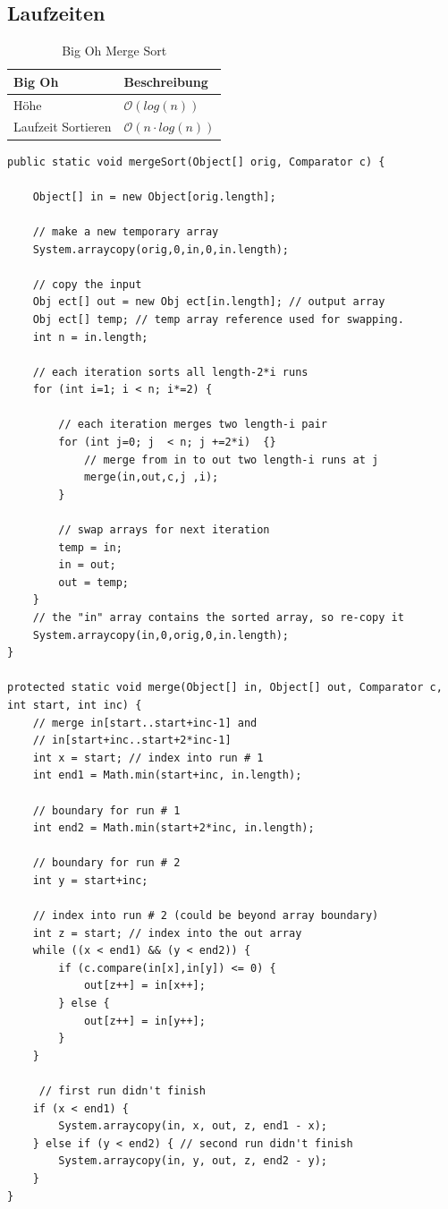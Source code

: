 \subsection{Laufzeiten}
\begin{table}[h]
	\centering
	\begin{tabu} to \linewidth {l l}
		\toprule
		Big Oh & Beschreibung \\
		\midrule
		Höhe & $\mathcal{O}(log (n))$ \\
		Laufzeit Sortieren & $\mathcal{O}(n \cdot log(n))$ \\
		\bottomrule
	\end{tabu}
	\caption{Big Oh Merge Sort}
\end{table}

\clearpage

\begin{lstlisting}[caption=Nicht Rekursiver Merge Sort]
public static void mergeSort(Object[] orig, Comparator c) {

	Object[] in = new Object[orig.length];

	// make a new temporary array
	System.arraycopy(orig,0,in,0,in.length);

	// copy the input
	Obj ect[] out = new Obj ect[in.length]; // output array
	Obj ect[] temp; // temp array reference used for swapping.
	int n = in.length;

	// each iteration sorts all length-2*i runs
	for (int i=1; i < n; i*=2) {

		// each iteration merges two length-i pair
		for (int j=0; j  < n; j +=2*i)  {}
			// merge from in to out two length-i runs at j
			merge(in,out,c,j ,i);
		}

		// swap arrays for next iteration
		temp = in;
		in = out;
		out = temp;
	}
	// the "in" array contains the sorted array, so re-copy it
	System.arraycopy(in,0,orig,0,in.length);
}

protected static void merge(Object[] in, Object[] out, Comparator c, int start, int inc) {
	// merge in[start..start+inc-1] and
	// in[start+inc..start+2*inc-1]
	int x = start; // index into run # 1
	int end1 = Math.min(start+inc, in.length);

	// boundary for run # 1
	int end2 = Math.min(start+2*inc, in.length);

	// boundary for run # 2
	int y = start+inc;

	// index into run # 2 (could be beyond array boundary)
	int z = start; // index into the out array
	while ((x < end1) && (y < end2)) {
		if (c.compare(in[x],in[y]) <= 0) {
			out[z++] = in[x++];
		} else {
			out[z++] = in[y++];
		}
	}

	 // first run didn't finish
	if (x < end1) {
		System.arraycopy(in, x, out, z, end1 - x);
	} else if (y < end2) { // second run didn't finish
		System.arraycopy(in, y, out, z, end2 - y);
	}
}
\end{lstlisting}

